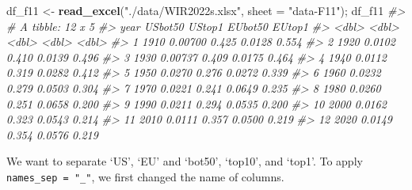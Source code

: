 \documentclass[
  xelatex, ja=standard]{bxjsbook}
\newenvironment{Shaded}{\begin{snugshade}}{\end{snugshade}}
\newcommand{\AttributeTok}[1]{\textcolor[rgb]{0.13,0.29,0.53}{#1}}
\newcommand{\CommentTok}[1]{\textcolor[rgb]{0.56,0.35,0.01}{\textit{#1}}}
\newcommand{\FunctionTok}[1]{\textcolor[rgb]{0.13,0.29,0.53}{\textbf{#1}}}
\newcommand{\NormalTok}[1]{#1}
\newcommand{\OtherTok}[1]{\textcolor[rgb]{0.56,0.35,0.01}{#1}}
\newcommand{\StringTok}[1]{\textcolor[rgb]{0.31,0.60,0.02}{#1}}
\theoremstyle{definition}
\theoremstyle{definition}
\theoremstyle{definition}
\theoremstyle{definition}
\theoremstyle{remark}
\begin{document}
\begin{Shaded}
\begin{Highlighting}[]
\NormalTok{df\_f11 }\OtherTok{\textless{}{-}} \FunctionTok{read\_excel}\NormalTok{(}\StringTok{"./data/WIR2022s.xlsx"}\NormalTok{, }\AttributeTok{sheet =} \StringTok{"data{-}F11"}\NormalTok{); df\_f11}
\CommentTok{\#\textgreater{} \# A tibble: 12 x 5}
\CommentTok{\#\textgreater{}     year USbot50 UStop1 EUbot50 EUtop1}
\CommentTok{\#\textgreater{}    \textless{}dbl\textgreater{}   \textless{}dbl\textgreater{}  \textless{}dbl\textgreater{}   \textless{}dbl\textgreater{}  \textless{}dbl\textgreater{}}
\CommentTok{\#\textgreater{}  1  1910 0.00700  0.425  0.0128  0.554}
\CommentTok{\#\textgreater{}  2  1920 0.0102   0.410  0.0139  0.496}
\CommentTok{\#\textgreater{}  3  1930 0.00737  0.409  0.0175  0.464}
\CommentTok{\#\textgreater{}  4  1940 0.0112   0.319  0.0282  0.412}
\CommentTok{\#\textgreater{}  5  1950 0.0270   0.276  0.0272  0.339}
\CommentTok{\#\textgreater{}  6  1960 0.0232   0.279  0.0503  0.304}
\CommentTok{\#\textgreater{}  7  1970 0.0221   0.241  0.0649  0.235}
\CommentTok{\#\textgreater{}  8  1980 0.0260   0.251  0.0658  0.200}
\CommentTok{\#\textgreater{}  9  1990 0.0211   0.294  0.0535  0.200}
\CommentTok{\#\textgreater{} 10  2000 0.0162   0.323  0.0543  0.214}
\CommentTok{\#\textgreater{} 11  2010 0.0111   0.357  0.0500  0.219}
\CommentTok{\#\textgreater{} 12  2020 0.0149   0.354  0.0576  0.219}
\end{Highlighting}
\end{Shaded}

We want to separate `US', `EU' and `bot50', `top10', and `top1'. To apply \texttt{names\_sep\ =\ "\_"}, we first changed the name of columns.
\end{document}

